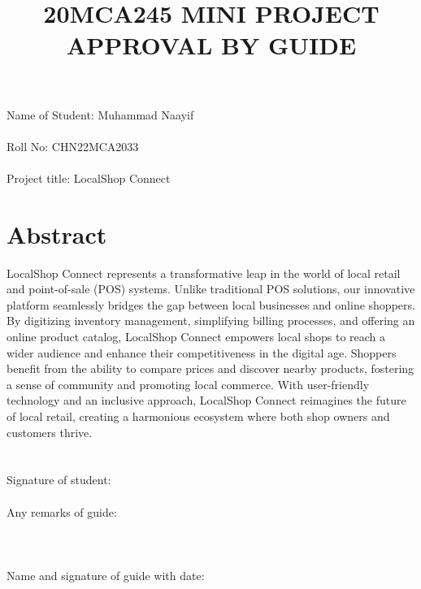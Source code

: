 \documentclass[a4paper]{article}
\title{20MCA245 MINI PROJECT\\\vspace{0.5em} APPROVAL BY GUIDE \vspace{-3em}}
\author{}
\date{}
\begin{document}
\maketitle
\section*{}
Name of Student: Muhammad Naayif\\\\Roll No: CHN22MCA2033\\\\Project title: LocalShop Connect

\section*{Abstract} %
LocalShop Connect represents a transformative leap in the world of local retail and point-of-sale (POS) systems. Unlike traditional POS solutions, our innovative platform seamlessly bridges the gap between local businesses and online shoppers. By digitizing inventory management, simplifying billing processes, and offering an online product catalog, LocalShop Connect empowers local shops to reach a wider audience and enhance their competitiveness in the digital age. Shoppers benefit from the ability to compare prices and discover nearby products, fostering a sense of community and promoting local commerce. With user-friendly technology and an inclusive approach, LocalShop Connect reimagines the future of local retail, creating a harmonious ecosystem where both shop owners and customers thrive.
\section*{}
Signature of student:\\\\Any remarks of guide:\\\\
\section*{}Name and signature of guide with date: 
\end{document}
